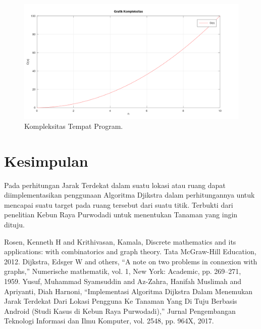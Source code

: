 \documentclass[conference]{IEEEtran}
\begin{document}
\begin{figure}[htbp]
\centerline{\includegraphics{fig2.png}}
\caption{Kompleksitas Tempat Program.}
\label{fig}
\end{figure}

\section{Kesimpulan}

Pada perhitungan Jarak Terdekat dalam suatu lokasi atau ruang dapat diimplementasikan penggunaan Algoritma Djikstra dalam perhitungannya untuk mencapai suatu target pada ruang tersebut dari suatu titik. Terbukti dari penelitian Kebun Raya Purwodadi untuk menentukan Tanaman yang ingin dituju.




\begin{thebibliography}{00}

 Rosen, Kenneth H and Krithivasan, Kamala, Discrete mathematics and its applications: with combinatorics and graph theory. Tata McGraw-Hill Education, 2012.
 Dijkstra, Edsger W and others, ``A note on two problems in connexion with graphs,'' Numerische mathematik, vol. 1, New York: Academic,  pp. 269--271, 1959.
 Yusuf, Muhammad Syamsuddin and Az-Zahra, Hanifah Muslimah and Apriyanti, Diah Harnoni, ``Implementasi Algoritma Dijkstra Dalam Menemukan Jarak Terdekat Dari Lokasi Pengguna Ke Tanaman Yang Di Tuju Berbasis Android (Studi Kasus di Kebun Raya Purwodadi),'' Jurnal Pengembangan Teknologi Informasi dan Ilmu Komputer, vol. 2548, pp. 964X, 2017.

\end{thebibliography}
\end{document}
